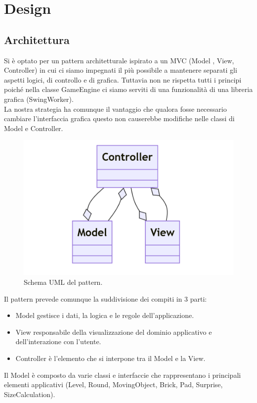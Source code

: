 \documentclass[a4paper,12pt]{report}
\begin{document}
\chapter{Design}
\section{Architettura}
Si è optato per un pattern architetturale ispirato a un MVC (Model , View, Controller) in cui ci siamo impegnati il più
possibile a mantenere separati gli aspetti logici, di controllo e di grafica. Tuttavia non ne rispetta tutti i principi poiché nella classe GameEngine ci siamo
serviti di una funzionalità di una libreria grafica (SwingWorker).
\\La nostra strategia ha comunque il vantaggio che qualora fosse necessario cambiare l'interfaccia grafica
questo non causerebbe modifiche nelle classi di Model e Controller.
\begin{figure}[H]
    \centering{}
    \includegraphics[scale=0.5]{images/MVC.png}
    \caption{Schema UML del pattern.}
    \label{images:MVC}
\end{figure}
Il pattern prevede comunque la suddivisione dei compiti in 3 parti:
\begin{itemize}
    \item Model gestisce i dati, la logica e le regole dell'applicazione.
    \item View responsabile della visualizzazione del dominio applicativo e dell'interazione con l'utente.
    \item Controller è l'elemento che si interpone tra il Model e la View.
\end{itemize}
Il Model è composto da varie classi e interfaccie che rappresentano i principali elementi applicativi (Level, Round, MovingObject, Brick, Pad, Surprise, SizeCalculation).
\end{document}
